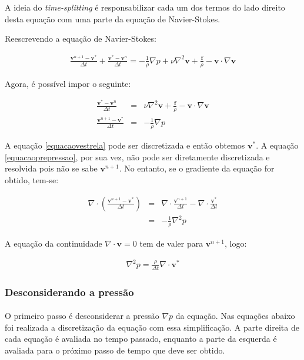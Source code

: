 \documentclass[poisson.tex]{subfiles}
\begin{document}
A ideia do \textit{time-splitting} é responsabilizar cada um dos termos do lado direito desta equação com uma parte da equação de Navier-Stokes.

Reescrevendo a equação de Navier-Stokes:

\begin{eqnarray*}
\frac{\textbf{v}^{n+1}-\textbf{v}^*}{\Delta t}+\frac{\textbf{v}^{*}-\textbf{v}^n}{\Delta t}=-\frac{1}{\rho}\nabla p + \nu\nabla ^2 \textbf{v} + \frac{\textbf{f}}{\rho} - \textbf{v}\cdot \nabla \textbf{v}
\end{eqnarray*}

Agora, é possível impor o seguinte:

\begin{eqnarray}
\frac{\textbf{v}^{*}-\textbf{v}^n}{\Delta t}&=& \nu\nabla ^2 \textbf{v} + \frac{\textbf{f}}{\rho} - \textbf{v}\cdot \nabla \textbf{v}\label{equacaovestrela}\\
\frac{\textbf{v}^{n+1}-\textbf{v}^*}{\Delta t}&=&-\frac{1}{\rho}\nabla p\label{equacaoprepressao}
\end{eqnarray}

A equação \ref{equacaovestrela} pode ser discretizada e então obtemos $\textbf{v}^*$. A equação \ref{equacaoprepressao}, por sua vez, não pode ser diretamente discretizada e resolvida pois não se sabe $\textbf{v}^{n+1}$. No entanto, se o gradiente da equação for obtido, tem-se:

\begin{eqnarray*}
\nabla\cdot \left(\frac{\textbf{v}^{n+1}-\textbf{v}^*}{\Delta t}\right)&=&\nabla\cdot\frac{\textbf{v}^{n+1}}{\Delta t}-\nabla\cdot \frac{\textbf{v}^*}{\Delta t}\\
&=&-\frac{1}{\rho}\nabla^2 p
\end{eqnarray*}

A equação da continuidade $\nabla\cdot \textbf{v}=0$ tem de valer para $\textbf{v}^{n+1}$, logo:

\begin{eqnarray}
\nabla^2 p = \frac{\rho}{\Delta t}\nabla\cdot\textbf{v}^*\label{eqpressao}
\end{eqnarray}

\subsubsection{Desconsiderando a pressão}
\paragraph{} O primeiro passo é desconsiderar a pressão $\nabla p$ da equação. Nas equações abaixo foi realizada a discretização da equação com essa simplificação. A parte direita de cada equação é avaliada no tempo passado, enquanto a parte da esquerda é avaliada para o próximo passo de tempo que deve ser obtido.
\end{document}
